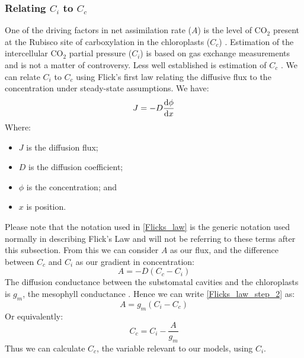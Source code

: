 \documentclass[11pt]{article} %
\begin{document}
\subsubsection{Relating $C_i$ to $C_c$}
One of the driving factors in net assimilation rate ($A$) is the level of CO$_2$ present at the Rubisco site of carboxylation in the chloroplasts ($C_c$) \cite{VonCaemmererSteadystatemodelsphotosynthesis2013}. Estimation of the intercellular CO$_2$ partial pressure ($C_i$) is based on gas exchange measurements and is not a matter of controversy. Less well established is estimation of $C_c$ \cite{YinTheoreticalreconsiderationswhen2009}.  We can relate $C_i$ to $C_c$ using Flick's first law relating the diffusive flux to the concentration  under steady-state assumptions. We have:
\begin{equation} \label{Flicks_law}
J = -D\dv{\phi}{x}
\end{equation}
Where:
\begin{itemize}
 \item $J$ is the diffusion flux;
 \item $D$ is the diffusion coefficient;
 \item $\phi$ is the concentration; and
 \item $x$ is position.
\end{itemize}
Please note that the notation used in \eqref{Flicks_law} is the generic notation used normally in describing Flick's Law and will not be referring to these terms after this subsection. From this we can consider $A$ as our flux, and the difference between $C_c$ and $C_i$ as our gradient in concentration:
\begin{equation} \label{Flicks_law_step_2}
A = -D(C_c - C_i)
\end{equation}
The diffusion conductance between the substomatal cavities and the chloroplasts is $g_m$, the mesophyll conductance \cite{NiinemetsImportancemesophylldiffusion2009}. Hence we can write \eqref{Flicks_law_step_2} as:
\begin{equation} \label{Flicks_law_photosynthesis_form}
A = g_m(C_i - C_c)
\end{equation}
Or equivalently:
\begin{equation} \label{Ci_Cc_relationship}
C_c = C_i - \frac{A}{g_m}
\end{equation}
Thus we can calculate $C_c$, the variable relevant to our models, using $C_i$.
\end{document}
